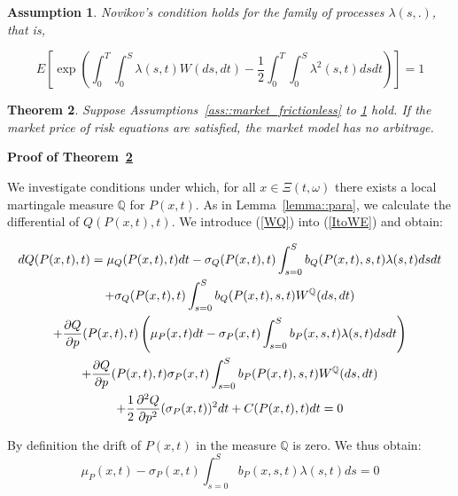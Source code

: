 \documentclass{article}
\newtheorem{theorem}{Theorem}[section]
\newtheorem{assumption}[theorem]{Assumption}
\begin{document}
\begin{assumption}\label{ass::novikov_condition_lambda}
Novikov's condition holds for the family of processes $%
\lambda (s,.)$, that is,

\begin{equation}
E[\exp (\int_{0}^{T}\int_{0}^{S}\lambda (s,t)W(ds,dt)-\frac{1}{2}%
\int_{0}^{T}\int_{0}^{S}\lambda ^{2}(s,t)dsdt)]=1  \label{Novikov}
\end{equation}%
\end{assumption}

\bigskip

\begin{theorem} \label{thm::no_arbitrage}
Suppose Assumptions~\ref{ass::market_frictionless} to \ref{ass::novikov_condition_lambda} hold. If the market price of
risk equations are satisfied, the market model has no arbitrage.
\end{theorem}

\bigskip

\textbf{Proof of Theorem~\ref{thm::no_arbitrage}}

We investigate conditions under which, for all $x\in \Xi (t,\omega )$ there
exists a local martingale measure $\mathbb{Q}$ for $P(x,t)$. As in Lemma~\ref{lemma::para},
we calculate the differential of $Q(P(x,t),t)$. We introduce (\ref{WQ}) into
(\ref{ItoWE}) and obtain:

\begin{gather}
dQ(P(x,t),t)=\mu _{Q}(P(x,t),t)dt-\sigma
_{Q}(P(x,t),t)\int_{s=0}^{S}b_{Q}(P(x,t),s,t)\lambda (s,t)dsdt
\label{dQ_inyheorem} \\
+\sigma _{Q}(P(x,t),t)\int_{s=0}^{S}b_{Q}(P(x,t),s,t)W^{\mathbb{Q}}(ds,dt)
\notag \\
+\frac{\partial Q}{\partial p}(P(x,t),t)\left( \mu _{P}(x,t)dt-\sigma
_{P}(x,t)\int_{s=0}^{S}b_{P}(x,s,t)\lambda (s,t)dsdt\right)  \notag \\
+\frac{\partial Q}{\partial p}(P(x,t),t)\sigma
_{P}(x,t)\int_{s=0}^{S}b_{P}(P(x,t),s,t)W^{\mathbb{Q}}(ds,dt)  \notag \\
+\frac{1}{2}\frac{\partial ^{2}Q}{\partial p^{2}}(\sigma
_{P}(x,t))^{2}dt+C(P(x,t),t)dt=0  \notag
\end{gather}

By definition the drift of $P(x,t)$ in the measure $\mathbb{Q}$ is zero. We
thus obtain:%
\begin{equation}
\mu _{P}(x,t)-\sigma _{P}(x,t)\int_{s=0}^{S}b_{P}(x,s,t)\lambda (s,t)ds=0
\label{MPR_star}
\end{equation}
\end{document}
